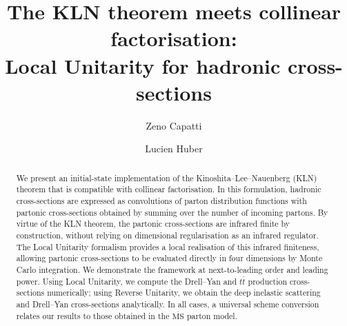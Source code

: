 \documentclass[%
 reprint,
 amsmath,amssymb,
 superscriptaddress,
 aps,
 preprintnumbers,
prl,
floatfix,
]{revtex4-2}
\begin{document}
\title{The KLN theorem meets collinear factorisation: \texorpdfstring{\\}{ }Local Unitarity for hadronic cross-sections 
}
%


\author{Zeno Capatti}

\author{Lucien Huber}



\begin{abstract}
We present an initial-state implementation of the Kinoshita--Lee--Nauenberg (KLN) theorem that is compatible with collinear factorisation.
In this formulation, hadronic cross-sections are expressed as convolutions of parton distribution functions with partonic cross-sections obtained by summing over the number of incoming partons.
By virtue of the KLN theorem, the partonic cross-sections are infrared finite by construction, without relying on dimensional regularisation as an infrared regulator.
The Local Unitarity formalism provides a local realisation of this infrared finiteness, allowing partonic cross-sections to be evaluated directly in four dimensions by Monte Carlo integration.
We demonstrate the framework at next-to-leading order and leading power.
Using Local Unitarity, we compute the Drell--Yan and $t\bar{t}$ production cross-sections numerically; using Reverse Unitarity, we obtain the deep inelastic scattering and Drell--Yan cross-sections analytically. In all cases, a universal scheme conversion relates our results to those obtained in the \(\overline{\mathrm{MS}}\) parton model. 

\end{abstract}

\maketitle
\end{document}
